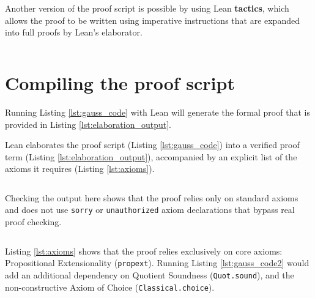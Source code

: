 \documentclass{article}
\begin{document}
\begin{listing}[!ht]
\inputminted[bgcolor=faintgray,breaklines]{lean4}{gauss.lean}
\caption{A Lean proof script of the Gauss summation identity}
\label{lst:gauss_code}
\end{listing}

Another version of the proof script is possible by using Lean \textbf{tactics}, which allows the proof to be written using imperative instructions that are expanded into full proofs by Lean's elaborator. 

\begin{listing}[!ht]
\inputminted[bgcolor=faintgray,breaklines]{lean4}{gauss-tactic.lean}
\caption{A alternative Lean proof script of the Gauss summation identity using tactics}
\label{lst:gauss_code2}
\end{listing}

\section{Compiling the proof script}

Running Listing \ref{lst:gauss_code} with Lean will generate the formal proof that is provided in Listing \ref{lst:elaboration_output}. 

Lean elaborates the proof script (Listing \ref{lst:gauss_code}) into a verified proof term (Listing \ref{lst:elaboration_output}), accompanied by an explicit list of the axioms it requires (Listing \ref{lst:axioms}).

\begin{listing}[!ht]
\inputminted[bgcolor=faintgray,breaklines]{lean4}{lean_output.txt}
\caption{The elaborated Lean proof of the Gauss summation identity from Listing \ref{lst:gauss_code}}
\label{lst:elaboration_output}
\end{listing}

Checking the output here shows that the proof relies only on standard axioms and does not use \texttt{sorry} or \texttt{unauthorized} axiom declarations that bypass real proof checking. 

\begin{listing}[!ht]
\inputminted[bgcolor=faintgray,breaklines]{lean4}{leanchecker_output.txt}
\caption{Output from Lean axiom checking}
\label{lst:axioms}
\end{listing}

Listing \ref{lst:axioms} shows that the proof relies exclusively on core  axioms: Propositional Extensionality (\texttt{propext}). Running Listing \ref{lst:gauss_code2} would add an additional dependency on Quotient Soundness (\texttt{Quot.sound}), and the non-constructive Axiom of Choice (\texttt{Classical.choice}).
\end{document}
